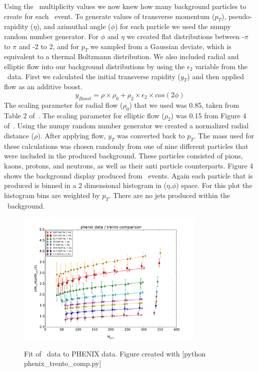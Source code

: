 \documentclass[11pt]{article}
\begin{document}
Using the \trento\ multiplicity values we now knew how many background particles to create for each \trento\ event. To generate values of transverse momentum ($p_T$), pseudo-rapidity ($\eta$), and azimuthal angle ($\phi$) for each particle we used the numpy random number generator. For $\phi$  and $\eta$ we created flat distributions between -$\pi$ to $\pi$ and -2 to 2, and for $p_T$ we sampled from a Gaussian deviate, which is equivalent to a thermal Boltzmann distribution. We also included radial and elliptic flow into our background distributions by using the $\epsilon_2$ variable from the \trento\ data. First we calculated the initial transverse rapidity ($y_T$) and then applied flow as an additive boost. 
\[y_{Boost} = \rho \times \rho_0 + \rho_2 \times \epsilon_2 \times cos(2\phi)\]
The scaling parameter for radial flow ($\rho_0$) that we used was 0.85, taken from Table 2 of~\cite{Retiere:2004hn}.  The scaling parameter for elliptic flow ($\rho_2$) was 0.15 from Figure 4 of~\cite{Alver:2010do}.  Using the numpy random number generator we created a normalized radial distance ($\rho$). After applying flow, $y_T$ was converted back to $p_T$. The mass used for these calculations was chosen randomly from one of nine different particles that were included in the produced background. These particles consisted of pions, kaons, protons, and neutrons, as well as their anti particle counterparts. Figure 4 shows the background display produced from \trento\ events. Again each particle that is produced is binned in a 2 dimensional histogram in ($\eta$,$\phi$) space. For this plot the histogram bins are weighted by $p_T$. There are no jets produced within the \trento\ background.

\begin{figure}[h]
\begin{center}
\includegraphics[width=0.8\textwidth]{phenix_trento_comp.pdf}
\label{fig_label}
\caption{Fit of \trento\ data to PHENIX data. Figure created with [python phenix\_trento\_comp.py]}
\end{center}
\end{figure}
\end{document}
